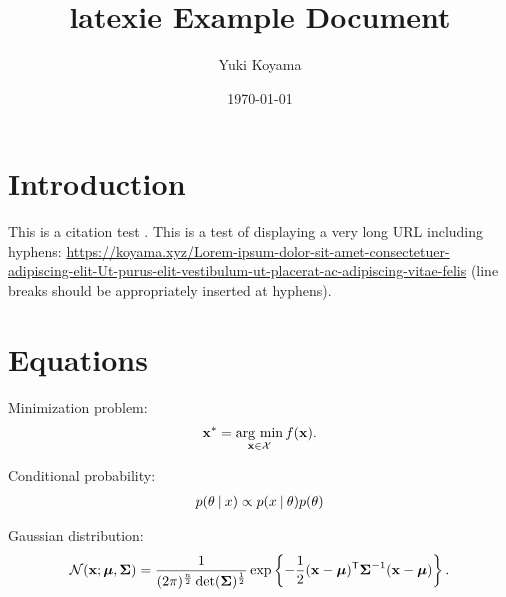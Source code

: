 \documentclass[]{latexie-article}
\title{latexie Example Document}
\author{Yuki Koyama}
\date{\today}
\begin{document}
\maketitle

\begin{abstract}
  \lipsum[1-2]
\end{abstract}

\tableofcontents

\section{Introduction}

This is a citation test \cite{Koyama:SIGGRAPH:17, Koyama:SIGGRAPH:20, Koyama:CHI:18}.
This is a test of displaying a very long URL including hyphens: \url{https://koyama.xyz/Lorem-ipsum-dolor-sit-amet-consectetuer-adipiscing-elit-Ut-purus-elit-vestibulum-ut-placerat-ac-adipiscing-vitae-felis} (line breaks should be appropriately inserted at hyphens).

\lipsum[1-5]

\section{Equations}

Minimization problem:
\begin{align}
  \mathbf{x}^{*} = \operatorname*{arg~min}_{\mathbf{x} \in \mathcal{X}} f(\mathbf{x}).
\end{align}

Conditional probability:
\begin{align}
  \cprob{\theta}{x} \propto \cprob{x}{\theta}\prob{\theta}
\end{align}

Gaussian distribution:
\begin{align}
  \mathcal{N}(\mathbf{x}; \boldsymbol{\mu}, \boldsymbol{\Sigma})
  =
  \frac{1}{(2 \pi)^{\frac{n}{2}} \det(\boldsymbol{\Sigma})^{\frac{1}{2}}}
  \exp \left\{
    - \frac{1}{2} (\mathbf{x} - \boldsymbol{\mu})^{\mathsf{T}} \boldsymbol{\Sigma}^{-1} (\mathbf{x} - \boldsymbol{\mu})
  \right\}.
\end{align}



\end{document}

